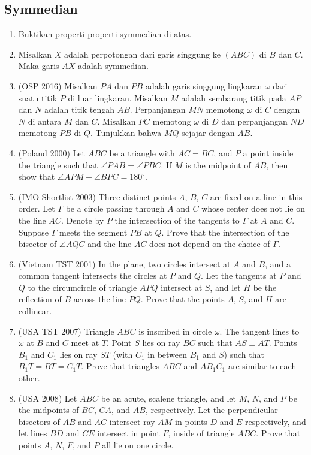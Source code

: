 \documentclass[12pt]{scrartcl}
\begin{document}
\subsection{Symmedian}
\begin{enumerate}
    \item Buktikan properti-properti symmedian di atas.
    \item Misalkan $X$ adalah perpotongan dari garis singgung ke $ (ABC) $ di $ B $ dan $ C $. Maka garis $ AX $ adalah symmedian.
    \item (OSP 2016) Misalkan $PA$ dan $PB$ adalah garis singgung lingkaran $\omega$ dari suatu titik $P$ di luar lingkaran. Misalkan $M$ adalah sembarang titik pada $AP$ dan $N$ adalah titik tengah $AB$. Perpanjangan $MN$ memotong $\omega$ di $C$ dengan $N$ di antara $M$ dan $C$. Misalkan $PC$ memotong $\omega$ di $D$ dan perpanjangan $ND$ memotong $PB$ di $Q$. Tunjukkan bahwa $MQ$ sejajar dengan $AB$.
    \item (Poland 2000) Let $ABC$ be a triangle with $AC = BC$, and $P$ a point inside the triangle such that $\angle PAB = \angle PBC$. If $M$ is the midpoint of $AB$, then show that $\angle APM + \angle BPC = 180^{\circ}$.

    \item (IMO Shortlist 2003) Three distinct points $A$, $B$, $C$ are fixed on a line in this order. Let $\Gamma$ be a circle passing through $A$ and $C$ whose center does not lie on the line $AC$. Denote by $P$ the intersection of the tangents to $\Gamma$ at $A$ and $C$. Suppose $\Gamma$ meets the segment $PB$ at $Q$. Prove that the intersection of the bisector of $\angle AQC$ and the line $AC$ does not depend on the choice of $\Gamma$.
    
    \item (Vietnam TST 2001) In the plane, two circles intersect at $A$ and $B$, and a common tangent intersects the circles at $P$ and $Q$. Let the tangents at $P$ and $Q$ to the circumcircle of triangle $APQ$ intersect at $S$, and let $H$ be the reflection of $B$ across the line $PQ$. Prove that the points $A$, $S$, and $H$ are collinear.
    
    \item (USA TST 2007) Triangle $ABC$ is inscribed in circle $\omega$. The tangent lines to $\omega$ at $B$ and $C$ meet at $T$. Point $S$ lies on ray $BC$ such that $AS \perp AT$. Points $B_1$ and $C_1$ lies on ray $ST$ (with $C_1$ in between $B_1$ and $S$) such that $B_1T = BT = C_1T$. Prove that triangles $ABC$ and $AB_1C_1$ are similar to each other.
    
    \item (USA 2008) Let $ABC$ be an acute, scalene triangle, and let $M$, $N$, and $P$ be the midpoints of $BC$, $CA$, and $AB$, respectively. Let the perpendicular bisectors of $AB$ and $AC$ intersect ray $AM$ in points $D$ and $E$ respectively, and let lines $BD$ and $CE$ intersect in point $F$, inside of triangle $ABC$. Prove that points $A$, $N$, $F$, and $P$ all lie on one circle.
\end{enumerate}
\end{document}
